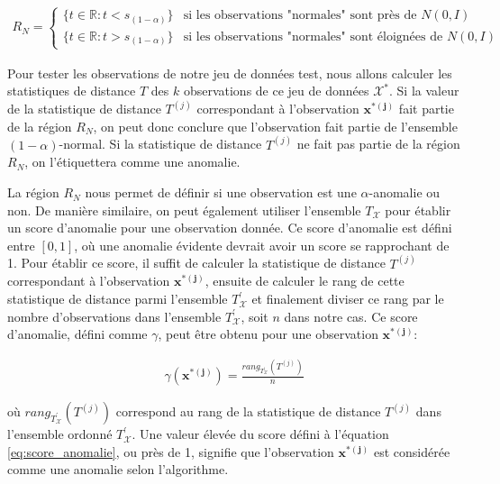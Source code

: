 \begin{gather} \label{eq:region}
	R_{N} = 
	\begin{cases} 
		\big\{t \in \mathbb{R}: t < s_{(1 - \alpha)} \big\} & \text{si les observations "normales" sont près de $N(0, I)$} \\
		\big\{t \in \mathbb{R}: t > s_{(1 - \alpha)} \big\} & \text{si les observations "normales" sont éloignées de $N(0, I)$} 
	\end{cases}
\end{gather}

Pour tester les observations de notre jeu de données test, nous allons calculer les statistiques de distance $T$ des $k$ observations de ce jeu de données $\mathcal{X^*}$. Si la valeur de la statistique de distance $T^{(j)}$ correspondant à l'observation $\boldsymbol{x^{*(j)}}$ fait partie de la région $R_N$, on peut donc conclure que l'observation fait partie de l'ensemble $(1-\alpha)$-normal. Si la statistique de distance $T^{(j)}$ ne fait pas partie de la région $R_N$, on l'étiquettera comme une anomalie.

La région $R_N$ nous permet de définir si une observation est une $\alpha$-anomalie ou non. De manière similaire, on peut également utiliser l'ensemble $T_{\mathcal{X}}$ pour établir un score d'anomalie pour une observation donnée. Ce score d'anomalie est défini entre $[0,1]$, où une anomalie évidente devrait avoir un score se rapprochant de 1. Pour établir ce score, il suffit de calculer la statistique de distance $T^{(j)}$ correspondant à l'observation $\boldsymbol{x^{*(j)}}$, ensuite de calculer le rang de cette statistique de distance parmi l'ensemble $T^{'}_{\mathcal{X}}$ et finalement diviser ce rang par le nombre d'observations dans l'ensemble $T^{'}_{\mathcal{X}}$, soit $n$ dans notre cas. Ce score d'anomalie, défini comme $\gamma$, peut être obtenu pour une observation $\boldsymbol{x^{*(j)}}$:

\begin{gather} \label{eq:score_anomalie}
	\gamma(\boldsymbol{x^{*(j)}}) = \frac{rang_{T^{'}_{\mathcal{X}}}(T^{(j)})}{n}
\end{gather}

où $rang_{T^{'}_{\mathcal{X}}}(T^{(j)})$ correspond au rang de la statistique de distance $T^{(j)}$ dans l'ensemble ordonné $T^{'}_{\mathcal{X}}$. Une valeur élevée du score défini à l'équation \ref{eq:score_anomalie}, ou près de 1, signifie que l'observation $\boldsymbol{x^{*(j)}}$ est considérée comme une anomalie selon l'algorithme.

